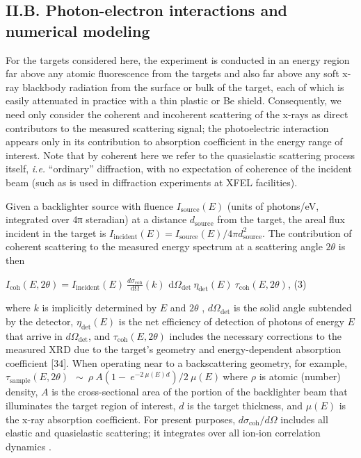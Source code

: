\FloatBarrier

\subsection{II.B. Photon-electron interactions and numerical modeling }

For the targets considered here, the experiment is conducted in an
energy region far above any atomic fluorescence from the targets and
also far above any soft x-ray blackbody radiation from the surface or
bulk of the target, each of which is easily attenuated in practice with
a thin plastic or Be shield. Consequently, we need only consider the
coherent and incoherent scattering of the x-rays as direct contributors
to the measured scattering signal; the photoelectric interaction appears
only in its contribution to absorption coefficient in the energy range
of interest. Note that by coherent here we refer to the quasielastic
scattering process itself, \emph{i.e.} ``ordinary'' diffraction, with no
expectation of coherence of the incident beam (such as is used in
diffraction experiments at XFEL facilities).

Given a backlighter source with fluence
\(I_{\text{source}}\left( E \right)\) (units of photons/eV, integrated
over 4π steradian) at a distance \(d_{\text{source}}\) from the target,
the areal flux incident in the target is
\(I_{\text{incident}}\left( E \right) = I_{\text{source}}\left( E \right)/4\pi d_{\text{source}}^{2}\).
The contribution of coherent scattering to the measured energy spectrum
at a scattering angle \(2\theta\) is then

\(I_{\text{coh}}\left( E,2\theta \right) = I_{\text{incident}}\left( E \right)\ \frac{d\sigma_{\text{coh}}}{\text{dΩ}}\left( k \right)\text{\ d}\Omega_{\det}\ \eta_{\det}\left( E \right)\ \tau_{\text{coh}}\left( E,2\theta \right)\),
(3)

where \(k\) is implicitly determined by \(E\) and \(2\theta\) ,
\(d\Omega_{\det}\) is the solid angle subtended by the detector,
\(\eta_{\det}\left( E \right)\) is the net efficiency of detection of
photons of energy \(E\) that arrive in \(d\Omega_{\det}\), and
\(\tau_{\text{coh}}\left( E,2\theta \right)\) includes the necessary
corrections to the measured XRD due to the target's geometry and
energy-dependent absorption coefficient
{[}34{]}.
When operating near to a backscattering geometry, for example,
\(\tau_{\text{sample}}\left( E,2\theta \right)\ \ \sim\ \rho\ A(1 - \ e^{- 2\ \mu\left( E \right)d})/2\ \mu(E)\ \)where
\(\rho\) is atomic (number) density, \(A\) is the cross-sectional area
of the portion of the backlighter beam that illuminates the target
region of interest, \(d\) is the target thickness, and
\(\mu\left( E \right)\) is the x-ray absorption coefficient. For present
purposes, \(d\sigma_{\text{coh}}/d\Omega\) includes all elastic and
quasielastic scattering; it integrates over all ion-ion correlation
dynamics
 \cite{GREGORI2009LOW}.


